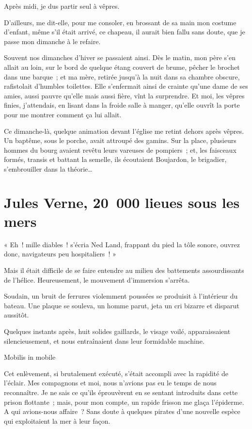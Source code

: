 \documentclass[petitlivre]{livrelitt}
\begin{document}
Après midi, je dus partir seul à vêpres.

D'ailleurs, me dit-elle, pour me consoler, en brossant de sa main mon costume d'enfant, même s'il était arrivé, ce chapeau, il aurait bien fallu sans doute, que je passe mon dimanche à le refaire.

Souvent nos dimanches d'hiver se passaient ainsi. Dès le matin, mon père s'en allait au loin, sur le bord de quelque étang couvert de brume, pêcher le brochet dans une barque ; et ma mère, retirée jusqu'à la nuit dans sa chambre obscure, rafistolait d'humbles toilettes. Elle s'enfermait ainsi de crainte qu'une dame de ses amies, aussi pauvre qu'elle mais aussi fière, vînt la surprendre. Et moi, les vêpres finies, j'attendais, en lisant dans la froide salle à manger, qu'elle ouvrît la porte pour me montrer comment ça lui allait.

Ce dimanche-là, quelque animation devant l'église me retint dehors après vêpres. Un baptême, sous le porche, avait attroupé des gamins. Sur la place, plusieurs hommes du bourg avaient revêtu leurs vareuses de pompiers ; et, les faisceaux formés, transis et battant la semelle, ils écoutaient Boujardon, le brigadier, s'embrouiller dans la théorie…

\chapter{Jules Verne, 20 000 lieues sous les mers}

« Eh ! mille diables ! s’écria Ned Land, frappant du pied la tôle sonore, ouvrez donc, navigateurs peu hospitaliers ! »

Mais il était difficile de se faire entendre au milieu des battements assourdissants de l’hélice. Heureusement, le mouvement d’immersion s’arrêta.

Soudain, un bruit de ferrures violemment poussées se produisit à l’intérieur du bateau. Une plaque se souleva, un homme parut, jeta un cri bizarre et disparut aussitôt.

Quelques instants après, huit solides gaillards, le visage voilé, apparaissaient silencieusement, et nous entraînaient dans leur formidable machine.

\separateurpar

Mobilis in mobile

Cet enlèvement, si brutalement exécuté, s’était accompli avec la rapidité de l’éclair. Mes compagnons et moi, nous n’avions pas eu le temps de nous reconnaître. Je ne sais ce qu’ils éprouvèrent en se sentant introduits dans cette prison flottante ; mais, pour mon compte, un rapide frisson me glaça l’épiderme. A qui avions-nous affaire ? Sans doute à quelques pirates d’une nouvelle espèce qui exploitaient la mer à leur façon.
\end{document}
